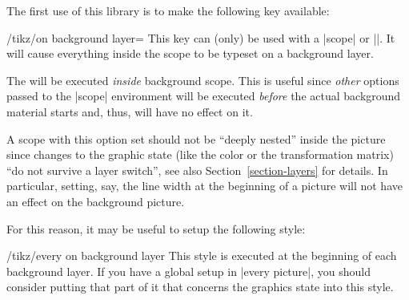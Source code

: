 The first use of this library is to make the following key available:
%
\begin{key}{/tikz/on background layer=}
    This key can (only) be used with a |{scope}| or |\scoped|. It will cause
    everything inside the scope to be typeset on a background layer.

    The  will be executed \emph{inside} background scope. This is
    useful since \emph{other} options passed to the |{scope}| environment will
    be executed \emph{before} the actual background material starts and, thus,
    will have no effect on it.
\begin{codeexample}[]
\end{codeexample}

    A scope with this option set should not be ``deeply nested'' inside the
    picture since changes to the graphic state (like the color or the
    transformation matrix) ``do not survive a layer switch'', see also
    Section~\ref{section-layers} for details. In particular, setting, say, the
    line width at the beginning of a picture will not have an effect on the
    background picture.

    For this reason, it may be useful to setup the following style:
    \begin{stylekey}{/tikz/every on background layer}
        This style is executed at the beginning of each background layer. If
        you have a global setup in |every picture|, you should consider putting
        that part of it that concerns the graphics state into this style.
\begin{codeexample}[]
\end{codeexample}
    \end{stylekey}
\end{key}


